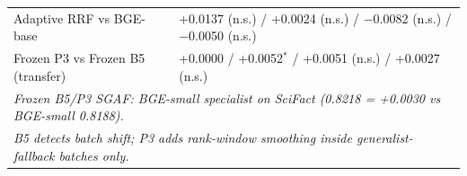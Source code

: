 \begin{table}[htbp]
{\begin{tabular}{lrrrrrrrrr}
\multicolumn{2}{l}{Adaptive RRF vs BGE-base} & \multicolumn{8}{l}{+0.0137 (n.s.) / +0.0024 (n.s.) / $-$0.0082 (n.s.) / $-$0.0050 (n.s.)} \\
\multicolumn{2}{l}{Frozen P3 vs Frozen B5 (transfer)} & \multicolumn{8}{l}{+0.0000 / +0.0052$^{*}$ / +0.0051 (n.s.) / +0.0027 (n.s.)} \\
\multicolumn{10}{l}{\footnotesize\textit{Frozen B5/P3 SGAF: BGE-small specialist on SciFact (0.8218 = +0.0030 vs BGE-small 0.8188).}} \\
\multicolumn{10}{l}{\footnotesize\textit{B5 detects batch shift; P3 adds rank-window smoothing inside generalist-fallback batches only.}} \\
\bottomrule
\end{tabular}
}
\end{table}
